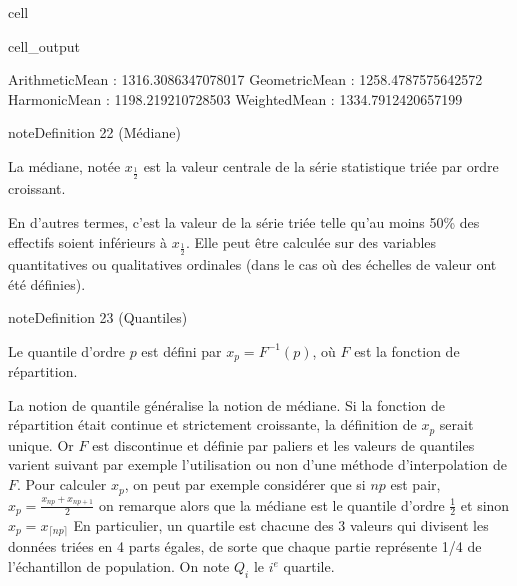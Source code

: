 \documentclass[letterpaper,10pt,english]{jupyterBook}
\begin{document}
\begin{sphinxuseclass}{cell}
\begin{sphinxVerbatimOutput}
\begin{sphinxuseclass}{cell_output}
\begin{sphinxVerbatim}[commandchars=\\\{\}]
ArithmeticMean  :  1316.3086347078017
GeometricMean  :  1258.4787575642572
HarmonicMean  :  1198.219210728503
WeightedMean  :  1334.7912420657199
\end{sphinxVerbatim}

\noindent{}

\end{sphinxuseclass}\end{sphinxVerbatimOutput}

\end{sphinxuseclass}\label{statsdescriptives:definition-6}
\begin{sphinxadmonition}{note}{Definition 22 (Médiane)}



\sphinxAtStartPar
La médiane, notée \(x_\frac{1}{2}\) est la valeur centrale de la série statistique triée par ordre croissant.
\end{sphinxadmonition}

\sphinxAtStartPar
En d’autres termes, c’est la valeur de la série triée telle qu’au moins 50\% des effectifs soient inférieurs à \(x_\frac{1}{2}\). Elle peut être calculée sur des variables quantitatives ou qualitatives ordinales (dans le cas où des échelles de valeur ont été définies).
\label{statsdescriptives:definition-7}
\begin{sphinxadmonition}{note}{Definition 23 (Quantiles)}



\sphinxAtStartPar
Le quantile d’ordre \(p\) est défini par \(x_p=F^{-1}(p)\), où \(F\) est la fonction de répartition.
\end{sphinxadmonition}

\sphinxAtStartPar
La notion de quantile généralise la notion de médiane. Si la fonction de répartition était continue et strictement croissante, la définition de \(x_p\) serait unique. Or \(F\) est discontinue et définie par paliers et les valeurs de quantiles varient suivant par exemple l’utilisation ou non d’une méthode d’interpolation de \(F\). Pour calculer \(x_p\), on peut par exemple considérer que si \(np\) est pair,
\(x_p=\frac{x_{np}+x_{np+1}}{2}\)
on remarque alors que la médiane est le quantile d’ordre \(\frac{1}{2}\)
et sinon
\(x_p=x_{\lceil{np}\rceil}\)
En particulier, un quartile est chacune des 3 valeurs qui divisent les données triées en 4 parts égales, de sorte que chaque partie représente 1/4 de l’échantillon de population. On note \(Q_i\) le \(i^e\) quartile.
\end{document}
